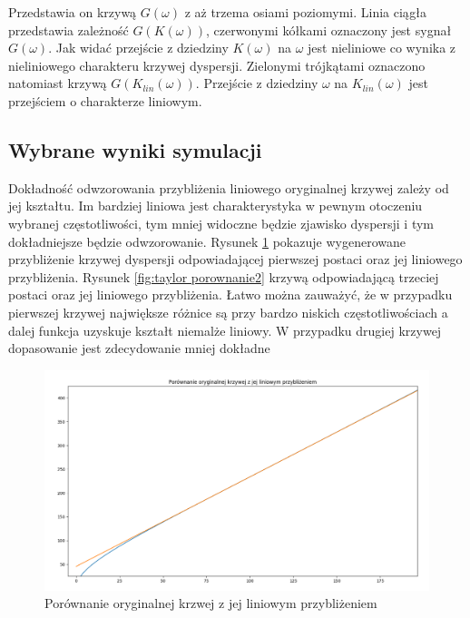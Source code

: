 Przedstawia on krzywą $G(\omega)$ z aż trzema osiami poziomymi. Linia ciągła przedstawia zależność $G(K(\omega))$, czerwonymi kółkami oznaczony jest sygnał $G(\omega)$. Jak widać przejście z dziedziny $K(\omega)$ na $\omega$ jest nieliniowe co wynika z nieliniowego charakteru krzywej dyspersji. Zielonymi trójkątami oznaczono natomiast krzywą $G(K_{lin}(\omega))$. Przejście z dziedziny $\omega$ na $K_{lin}(\omega)$ jest przejściem o charakterze liniowym. 
\subsection{Wybrane wyniki symulacji}
Dokładność odwzorowania przybliżenia liniowego oryginalnej krzywej zależy od jej kształtu. Im bardziej liniowa jest charakterystyka w pewnym otoczeniu wybranej częstotliwości, tym mniej widoczne będzie zjawisko dyspersji i tym dokładniejsze będzie odwzorowanie. Rysunek \ref{fig:taylor porownanie} pokazuje wygenerowane przybliżenie krzywej dyspersji odpowiadającej pierwszej postaci oraz jej liniowego przybliżenia. Rysunek \ref{fig:taylor porownanie2} krzywą odpowiadającą trzeciej postaci oraz jej liniowego przybliżenia. Łatwo można zauważyć, że w przypadku pierwszej krzywej największe różnice są przy bardzo niskich częstotliwościach a dalej funkcja uzyskuje kształt niemalże liniowy. W przypadku drugiej krzywej dopasowanie jest zdecydowanie mniej dokładne

\begin{figure}[h]
\centering
\includegraphics[width=13cm]{Zdjecia/4/taylorporownanie}
\caption{Porównanie oryginalnej krzwej z jej liniowym przybliżeniem}
\label{fig:taylor porownanie}
\end{figure}

